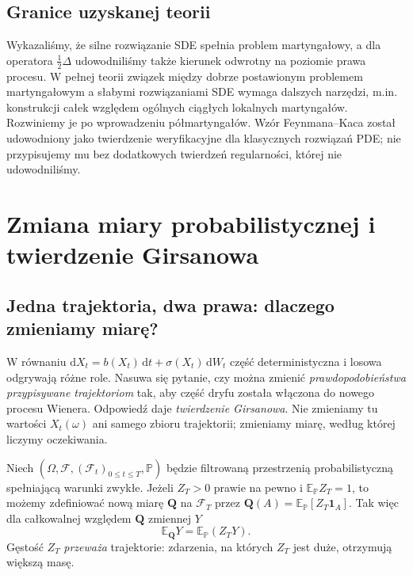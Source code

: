 \documentclass[11pt,a4paper,oneside]{report}
\numberwithin{equation}{chapter}
\theoremstyle{plain}
\theoremstyle{definition}
\theoremstyle{remark}
\newcommand{\Prob}{\mathbb{P}}
\newcommand{\E}{\mathbb{E}}
\newcommand{\calF}{\mathcal{F}}
\newcommand{\ind}[1]{\mathbf{1}_{#1}}
\newcommand{\dd}{\mathrm{d}}
\begin{document}
\section{Granice uzyskanej teorii}
Wykazaliśmy, że silne rozwiązanie SDE spełnia problem martyngałowy,
a dla operatora $\frac12\Delta$ udowodniliśmy także kierunek odwrotny
na poziomie prawa procesu. W pełnej teorii związek między dobrze
postawionym problemem martyngałowym a słabymi rozwiązaniami SDE
wymaga dalszych narzędzi, m.in. konstrukcji całek względem ogólnych
ciągłych lokalnych martyngałów. Rozwiniemy je po wprowadzeniu
półmartyngałów. Wzór Feynmana--Kaca został udowodniony jako
twierdzenie weryfikacyjne dla klasycznych rozwiązań PDE;
nie przypisujemy mu bez dodatkowych twierdzeń regularności,
której nie udowodniliśmy.


\chapter{Zmiana miary probabilistycznej i twierdzenie Girsanowa}
\label{ch:girsanov}

\section{Jedna trajektoria, dwa prawa: dlaczego zmieniamy miarę?}

W równaniu $\dd X_t=b(X_t)\,\dd t+\sigma(X_t)\,\dd W_t$
część deterministyczna i losowa odgrywają różne role.
Nasuwa się pytanie, czy można zmienić \emph{prawdopodobieństwa
przypisywane trajektoriom} tak, aby część dryfu została
włączona do nowego procesu Wienera. Odpowiedź daje
\emph{twierdzenie Girsanowa}. Nie zmieniamy tu wartości $X_t(\omega)$
ani samego zbioru trajektorii; zmieniamy miarę, według której
liczymy oczekiwania.

Niech $(\Omega,\calF,(\calF_t)_{0\le t\le T},\Prob)$
będzie filtrowaną przestrzenią probabilistyczną spełniającą
warunki zwykłe. Jeżeli $Z_T>0$ prawie na pewno i
$\E_{\Prob}Z_T=1$, to możemy zdefiniować nową miarę
$\mathbf Q$ na $\calF_T$ przez
$\mathbf Q(A)=\E_{\Prob}[Z_T\ind A]$.
Tak więc dla całkowalnej względem $\mathbf Q$ zmiennej $Y$
\[
\E_{\mathbf Q}Y=\E_{\Prob}(Z_TY).
\]
Gęstość $Z_T$ \emph{przeważa} trajektorie: zdarzenia,
na których $Z_T$ jest duże, otrzymują większą masę.
\end{document}
